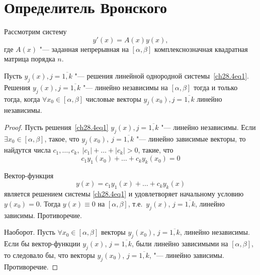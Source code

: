 \section{Определитель Вронского}

Рассмотрим систему 
\begin{equation} \label{ch28.4eq1}
y'(x) = A(x)y(x),
\end{equation}
где $A(x)$ "--- заданная непрерывная на $[\alpha, \beta]$ комплекснозначная квадратная матрица порядка $n$.

\begin{thm} \label{ch28.3thm1}
Пусть $y_j(x), j = \overline{1,k}$ "--- решения линейной однородной системы~\eqref{ch28.4eq1}. Решения $y_j(x), j = \overline{1,k}$ "--- линейно независимы на $[\alpha, \beta]$ тогда и только тогда, когда $\forall x_0 \in [\alpha, \beta]$ числовые векторы $y_j(x_0), j = \overline{1,k}$ линейно независимы.
\end{thm}

\begin{proof}
Пусть решения~\eqref{ch28.4eq1} $y_j(x), j = \overline{1,k}$ "--- линейно независимы. Если $\exists x_0 \in [\alpha, \beta]$, такое, что $y_j(x_0),\ j = \overline{1,k}$ "--- линейно зависимые векторы, то найдутся числа $c_1, \ldots, c_k, \; |c_1| + \ldots + |c_k| > 0$, такие, что
$$
c_1y_1(x_0) + \ldots + c_k y_k(x_0) = 0
$$

Вектор-функция
$$
y(x) = c_1y_1(x) + \ldots + c_k y_k(x)
$$
является решением системы \eqref{ch28.4eq1} и удовлетворяет начальному условию $y(x_0) = 0$. Тогда $y(x) \equiv 0$ на $[\alpha, \beta]$, т.е.~$y_j(x)$, $j = \overline{1,k}$, линейно зависимы. Противоречие.

Наоборот. Пусть $\forall x_0 \in [\alpha, \beta]$ векторы $y_j(x_0)$, $j = \overline{1,k}$, линейно независимы. Если бы вектор-функции $y_j(x)$, $j = \overline{1,k}$, были линейно зависимыми на $[\alpha,\beta]$, то следовало бы, что векторы $y_j(x_0)$, $j = \overline{1,k}$, "--- линейно зависимы. Противоречие.
\end{proof}

